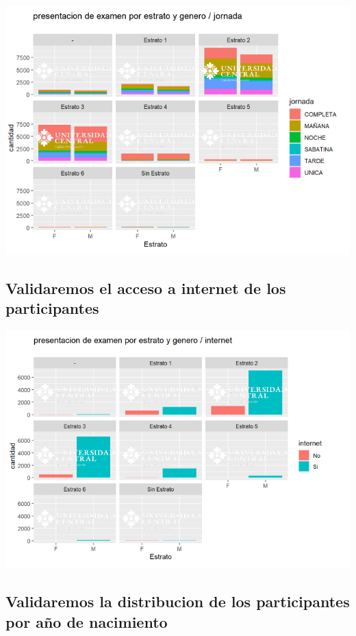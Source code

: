 \documentclass{article}
\begin{document}
\begin{center}
\includegraphics[scale=0.5]{Captura8.PNG} 
\end{center}

\subsection{Validaremos el acceso a internet de los participantes}

\begin{center}
\includegraphics[scale=0.5]{Captura9.PNG} 
\end{center}

\subsection{Validaremos la distribucion de los participantes por año de nacimiento}
\end{document}
